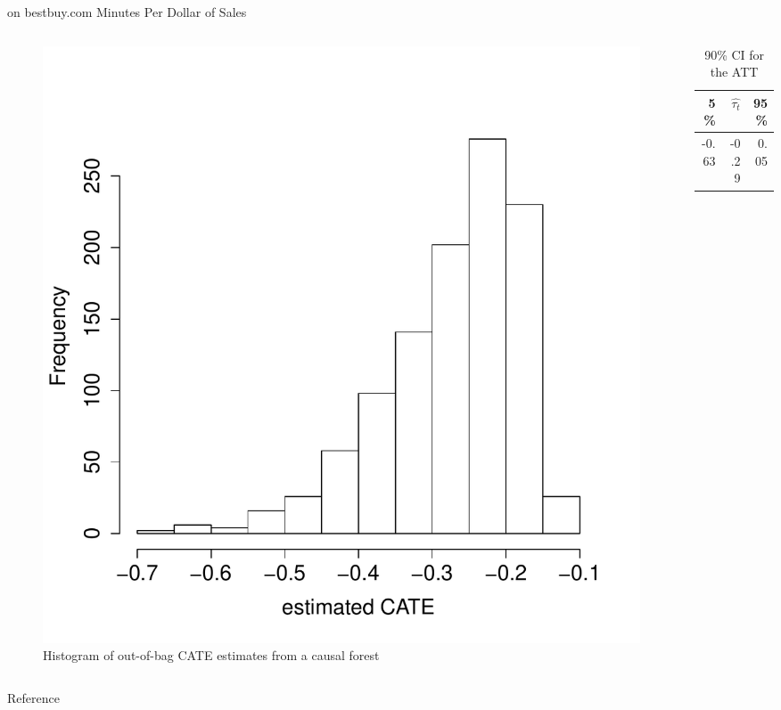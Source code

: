 \documentclass[mathserif, xcolor=table]{beamer}
\begin{document}
\begin{frame}{on bestbuy.com Minutes Per Dollar of Sales}
\vspace{-1em}
\begin{columns}
\begin{column}{.6\textwidth}
 \begin{figure}[h]
    \centering
    \includegraphics[scale=0.3]{figures/tauhat5_bb_hist.pdf}
    \caption{ Histogram of out-of-bag CATE estimates from a causal forest}
    \label{fig:tauhat5_bb_hist}
\end{figure}
 \end{column}
 
 \begin{column}{.39\textwidth}
\begin{table}[h]
\caption{90\% CI for the ATT}
\centering
\begin{tabular}{rrr}
  \hline
5\%  & $\hat{\tau_t}$ & 95\% \\ 
  \hline
 -0.63 & -0.29 & 0.05 \\ 
   \hline
\end{tabular}
\end{table}
 \end{column}
\end{columns}
\end{frame}


\begin{frame}{Reference}
	
	
\end{frame}
\end{document}
